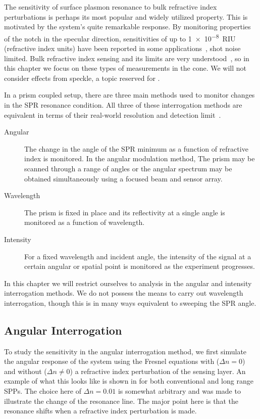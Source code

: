The sensitivity of surface plasmon resonance to bulk refractive index
perturbations is perhaps its most popular and widely utilized property.
This is motivated by the system's quite remarkable response. By monitoring
properties of the notch in the specular direction, sensitivities of up to
\SI{1e-8}{RIU} (refractive index units) have been reported in some
applications~\cite{fan2008sensitive}, shot noise limited.  Bulk refractive
index sensing and its limits are very
understood~\cite{piliarik2009surface}, so in this chapter we focus on these
types of measurements in the cone.  We will not consider effects from
speckle, a topic reserved for .  

In a prism coupled setup, there are three main methods used to
monitor changes in the SPR resonance condition.  All three of these
interrogation methods are equivalent in terms of their real-world
resolution and detection limit~\cite{homola2006surface}.
\begin{description}
	\item [{Angular}] The change in the angle of the SPR minimum as a function
					of refractive index is monitored.  In the angular modulation method,
					The prism may be scanned through a range of angles or the angular
					spectrum may be obtained simultaneously using a focused beam and
					sensor array.
 \item [{Wavelength}] The prism is fixed in place and its reflectivity at
  a single angle is monitored as a function of wavelength.
	\item [{Intensity}] For a fixed wavelength and incident angle, the
		intensity of the signal at a certain angular or spatial point is
		monitored as the experiment progresses.
\end{description}
In this chapter we will restrict ourselves to analysis in the angular and
intensity interrogation methods.  We do not possess the means to carry out
wavelength interrogation, though this is in many ways equivalent to
sweeping the SPR angle. 

\subsection{Angular Interrogation}
To study the sensitivity in the angular interrogation method, we first
simulate the angular response of the system using the Fresnel equations
with ($\Delta n = 0$) and without ($\Delta n \ne 0$) a refractive index
perturbation of the sensing layer.  An example of what this looks like is
shown in  for both conventional and long range
SPPs.  The choice here of 
$\Delta n = 0.01$ is somewhat arbitrary and was made to 
illustrate the change of the resonance line.  The major point here is that
the resonance shifts when a refractive index perturbation is made.

